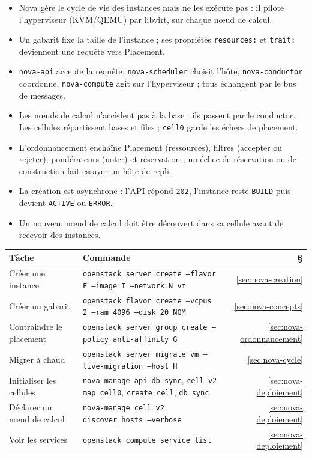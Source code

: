 \begin{aretenir}
\begin{itemize}
  \item Nova gère le cycle de vie des instances mais ne les exécute pas : il pilote l'hyperviseur (KVM/QEMU) par
        libvirt, sur chaque nœud de calcul.
  \item Un gabarit fixe la taille de l'instance ; ses propriétés \texttt{resources:} et \texttt{trait:} deviennent une
        requête vers Placement.
  \item \texttt{nova-api} accepte la requête, \texttt{nova-scheduler} choisit l'hôte, \texttt{nova-conductor}
        coordonne, \texttt{nova-compute} agit sur l'hyperviseur ; tous échangent par le bus de messages.
  \item Les nœuds de calcul n'accèdent pas à la base : ils passent par le conductor. Les cellules répartissent
        bases et files ; \texttt{cell0} garde les échecs de placement.
  \item L'ordonnancement enchaîne Placement (ressources), filtres (accepter ou rejeter), pondérateurs (noter) et
        réservation ; un échec de réservation ou de construction fait essayer un hôte de repli.
  \item La création est asynchrone : l'API répond \texttt{202}, l'instance reste \texttt{BUILD} puis devient
        \texttt{ACTIVE} ou \texttt{ERROR}.
  \item Un nouveau nœud de calcul doit être découvert dans sa cellule avant de recevoir des instances.
\end{itemize}
\end{aretenir}

\begin{center}
\renewcommand{\arraystretch}{1.35}
\begin{tabular}{@{}>{\raggedright\arraybackslash}p{4.2cm}>{\raggedright\arraybackslash}p{9.9cm}r@{}}
\toprule
\textbf{Tâche} & \textbf{Commande} & \textbf{§} \\
\midrule
Créer une instance & \texttt{openstack server create --flavor F --image I --network N vm} & \ref{sec:nova-creation} \\
Créer un gabarit & \texttt{openstack flavor create --vcpus 2 --ram 4096 --disk 20 NOM} & \ref{sec:nova-concepts} \\
Contraindre le placement & \texttt{openstack server group create --policy anti-affinity G} & \ref{sec:nova-ordonnancement} \\
Migrer à chaud & \texttt{openstack server migrate vm --live-migration --host H} & \ref{sec:nova-cycle} \\
Initialiser les cellules & \texttt{nova-manage api\_db sync}, \texttt{cell\_v2 map\_cell0}, \texttt{create\_cell}, \texttt{db sync} & \ref{sec:nova-deploiement} \\
Déclarer un nœud de calcul & \texttt{nova-manage cell\_v2 discover\_hosts --verbose} & \ref{sec:nova-deploiement} \\
Voir les services & \texttt{openstack compute service list} & \ref{sec:nova-deploiement} \\
\bottomrule
\end{tabular}
\end{center}

